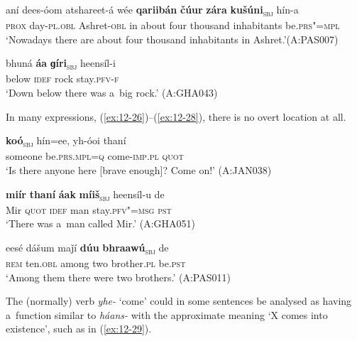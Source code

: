 \begin{exe}
\ex
\label{ex:12-24}
\gll aní dees-óom atshareet-á wée {\ob}\textbf{qariibán} \textbf{čúur} \textbf{zára} \textbf{kušúni}{\cb}\textsubscript{\textsc{\upshape sbj}} hín-a \\
\textsc{prox} day-\textsc{pl.obl} Ashret-\textsc{obl} in about  four thousand inhabitants be.\textsc{prs"=mpl}\\
\glt `Nowadays there are about four thousand inhabitants in Ashret.'\newline (A:PAS007)

\ex
\label{ex:12-25}
\gll bhuná {\ob}\textbf{áa} \textbf{ɡíri}{\cb}\textsubscript{\textsc{\upshape sbj}} heensíl-i\\
below \textsc{idef} rock stay.\textsc{pfv-f} \\
\glt `Down below there was a~big rock.' (A:GHA043)
\end{exe}

In many  expressions, (\ref{ex:12-26})--(\ref{ex:12-28}), there is no overt location at all.

\begin{exe}
\ex
\label{ex:12-26}
\gll {\ob}\textbf{koó}{\cb}\textsubscript{\textsc{\upshape sbj}} hín=ee, yh-óoi thaní \\
someone be.\textsc{prs.mpl}=\textsc{q} come-\textsc{imp.pl} \textsc{quot} \\
\glt `Is there anyone here [brave enough]? Come on!' (A:JAN038)
\end{exe}
\begin{exe}
\ex
\label{ex:12-27}
\gll {\ob}\textbf{miír} \textbf{thaní} \textbf{áak} \textbf{míiš}{\cb}\textsubscript{\textsc{\upshape sbj}} heensíl-u de \\
Mir \textsc{quot} \textsc{idef} man stay.\textsc{pfv"=msg} \textsc{pst} \\
\glt `There was a~man called Mir.' (A:GHA051)
\end{exe}
\begin{exe}
\ex
\label{ex:12-28}
\gll eesé dášum maǰí {\ob}\textbf{dúu} \textbf{bhraawú}{\cb}\textsubscript{\textsc{\upshape sbj}} de\\
\textsc{rem} ten.\textsc{obl} among two brother.\textsc{pl} be.\textsc{pst}\\
\glt `Among them there were two brothers.' (A:PAS011)
\end{exe}

The (normally)  verb \textit{yhe-} `come' could in some sentences be analysed as having a~function similar to \textit{háans-} with the approximate meaning `X comes into existence', such as in (\ref{ex:12-29}).

